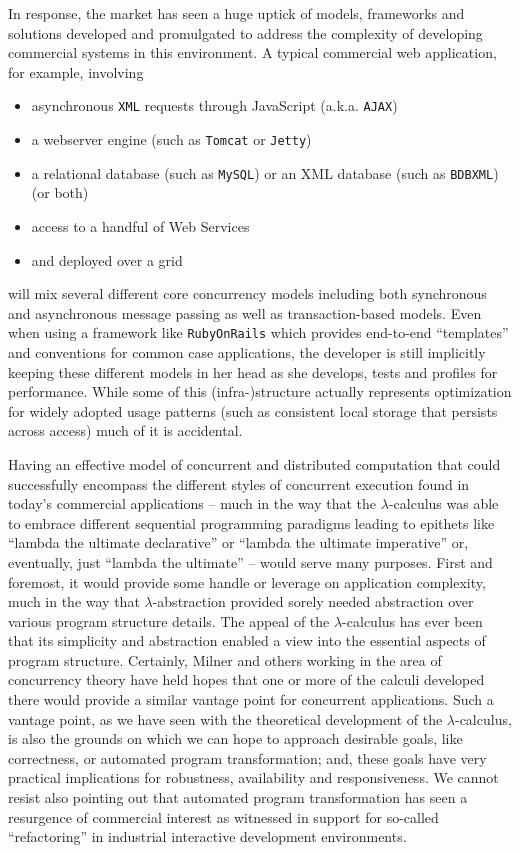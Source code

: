 In response, the market has seen a huge uptick of models, frameworks
and solutions developed and promulgated to address the complexity of
developing commercial systems in this environment. A typical
commercial web application, for example, involving
\begin{itemize}
\item asynchronous \texttt{XML} requests through JavaScript
  (a.k.a. \texttt{AJAX}) \cite{}
\item a webserver engine (such as \texttt{Tomcat} or \texttt{Jetty}) \cite{}
\item a relational database (such as \texttt{MySQL}) or an XML
  database (such as \texttt{BDBXML}) (or both) \cite{}
\item access to a handful of Web Services \cite{}
\item and deployed over a grid \cite{}
\end{itemize}
will mix several different core concurrency models including both
synchronous and asynchronous message passing as well as
transaction-based models. Even when using a framework like
\texttt{RubyOnRails} \cite{} which provides end-to-end ``templates''
and conventions for common case applications, the developer is still
implicitly keeping these different models in her head as she develops,
tests and profiles for performance. While some of this
(infra-)structure actually represents optimization for widely adopted
usage patterns (such as consistent local storage that persists across
access) much of it is accidental.

Having an effective model of concurrent and distributed computation
that could successfully encompass the different styles of concurrent
execution found in today's commercial applications -- much in the way
that the $\lambda$-calculus was able to embrace different sequential
programming paradigms leading to epithets like ``lambda the ultimate
declarative'' or ``lambda the ultimate imperative'' or, eventually,
just ``lambda the ultimate'' \cite{} -- would serve many
purposes. First and foremost, it would provide some handle or leverage
on application complexity, much in the way that $\lambda$-abstraction
provided sorely needed abstraction over various program structure
details. The appeal of the $\lambda$-calculus has ever been that its
simplicity and abstraction enabled a view into the essential aspects
of program structure. Certainly, Milner and others working in the area
of concurrency theory have held hopes that one or more of the calculi
developed there would provide a similar vantage point for concurrent
applications. Such a vantage point, as we have seen with the
theoretical development of the $\lambda$-calculus, is also the grounds
on which we can hope to approach desirable goals, like correctness, or
automated program transformation; and, these goals have very practical
implications for robustness, availability and responsiveness. We
cannot resist also pointing out that automated program transformation
has seen a resurgence of commercial interest as witnessed in support
for so-called ``refactoring'' in industrial interactive development
environments.

